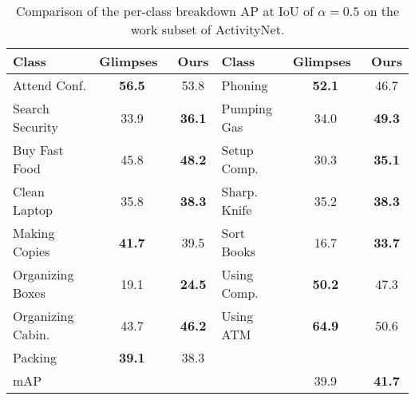 \documentclass{bmvc2k}
\begin{document}
\begin{table}[thb]
\small
	\centering
	\begin{tabular}{lcclcc}
		\toprule
		Class & Glimpses~\cite{yeung2015end} & Ours & Class & Glimpses~\cite{yeung2015end} & Ours\\
		\midrule
		Attend Conf. & \textbf{56.5} & 53.8 & Phoning & \textbf{52.1} & 46.7\\
		Search Security & 33.9 & \textbf{36.1} & Pumping Gas & 34.0 & \textbf{49.3}\\
        Buy Fast Food & 45.8 & \textbf{48.2} & Setup Comp. & 30.3 & \textbf{35.1}\\
        Clean Laptop & 35.8 & \textbf{38.3} & Sharp. Knife & 35.2 & \textbf{38.3}\\
        Making Copies & \textbf{41.7} & 39.5 & Sort Books & 16.7 & \textbf{33.7}\\
        Organizing Boxes & 19.1 & \textbf{24.5} & Using Comp. & \textbf{50.2} & 47.3\\
        Organizing Cabin. & 43.7 & \textbf{46.2} & Using ATM & \textbf{64.9} & 50.6\\
        Packing & \textbf{39.1} & 38.3 & & & \\
        \midrule
        mAP & & & & 39.9 & \textbf{41.7}\\
		\bottomrule 
	\end{tabular}
	\vspace{10pt}
	\caption{Comparison of the per-class breakdown AP at IoU of $\alpha = 0.5$ on the work subset of ActivityNet.}
	\label{tab:work}
\end{table}
\end{document}
